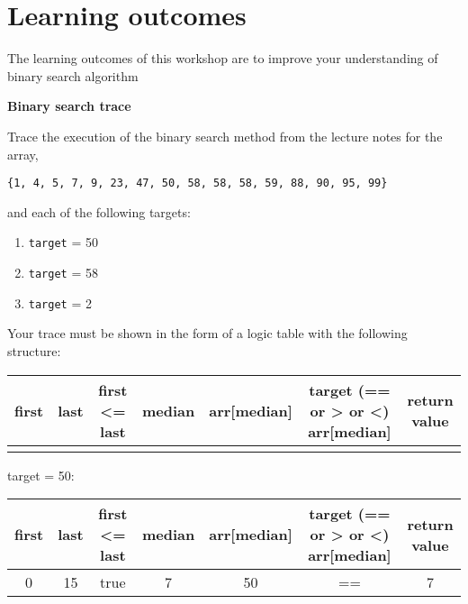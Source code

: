
\section* {Learning outcomes}

The learning outcomes of this workshop are to improve your understanding of binary search algorithm

\begin{center}
\end{center}

\begin{questions}
\question \textbf{Binary search trace}

Trace the execution of the binary search method from the lecture notes for the array, 
\begin{verbatim}
{1, 4, 5, 7, 9, 23, 47, 50, 58, 58, 58, 59, 88, 90, 95, 99}
\end{verbatim}

and each of the following targets:

\begin{enumerate}
  \item \texttt{target} = 50
  \item \texttt{target} = 58
  \item \texttt{target} = 2
\end{enumerate}

Your trace must be shown in the form of a logic table with the following structure:
\vskip 0.5cm

\small
\begin{tabular}{c | c | c | c | c | c | c} 
\hline
first &	last &	first <= last & median & arr[median] & target (== or > or <) arr[median] & return value\\
\hline
& & & & & & \\
\hline
\end{tabular}
\normalsize
\vskip 0.5cm

\begin{solution}
\small
target = 50:
\vskip 0.2cm
\begin{tabular}{c | c | c | c | c | c | c} 
\hline
first &	last &	first <= last & median & arr[median] & target (== or > or <) arr[median] & return value\\
\hline
0 & 15 & true & 7 & 50 & == & 7\\
\hline
\end{tabular}
\vskip 0.5cm
	

\end{solution}
\end{questions}
